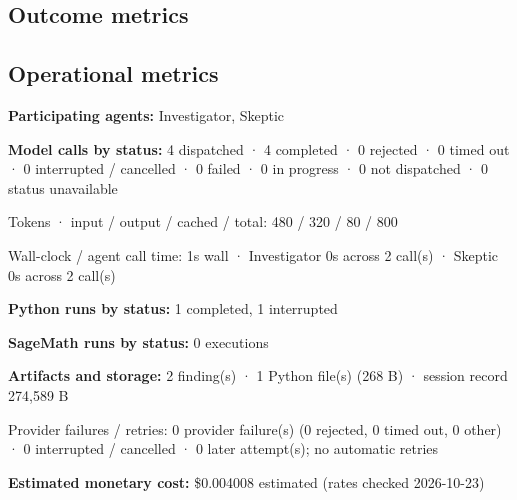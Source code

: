 \documentclass[11pt]{article}
\begin{document}
\subsection{Outcome metrics}
\subsection{Operational metrics}
\textbf{Participating agents:} Investigator, Skeptic\par
\textbf{Model calls by status:} 4 dispatched · 4 completed · 0 rejected · 0 timed out · 0 interrupted / cancelled · 0 failed · 0 in progress · 0 not dispatched · 0 status unavailable\par
Tokens · input / output / cached / total: 480 / 320 / 80 / 800\par
Wall-clock / agent call time: 1s wall · Investigator 0s across 2 call(s) · Skeptic 0s across 2 call(s)\par
\textbf{Python runs by status:} 1 completed, 1 interrupted\par
\textbf{SageMath runs by status:} 0 executions\par
\textbf{Artifacts and storage:} 2 finding(s) · 1 Python file(s) (268 B) · session record 274,589 B\par
Provider failures / retries: 0 provider failure(s) (0 rejected, 0 timed out, 0 other) · 0 interrupted / cancelled · 0 later attempt(s); no automatic retries\par
\textbf{Estimated monetary cost:} \$0.004008 estimated (rates checked 2026-10-23)\par
\end{document}
